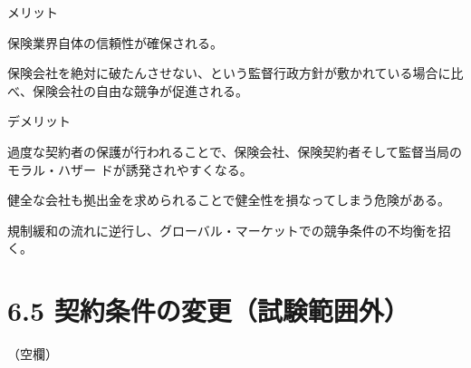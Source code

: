 \documentclass[report,gutter=10mm,fore-edge=10mm,uplatex,dvipdfmx]{jlreq}
\begin{document}
メリット

保険業界自体の信頼性が確保される。

保険会社を絶対に破たんさせない、という監督行政方針が敷かれている場合に比べ、保険会社の自由な競争が促進される。

デメリット

過度な契約者の保護が行われることで、保険会社、保険契約者そして監督当局のモラル・ハザー
ドが誘発されやすくなる。

健全な会社も拠出金を求められることで健全性を損なってしまう危険がある。

規制緩和の流れに逆行し、グローバル・マーケットでの競争条件の不均衡を招く。


\section{6.5 契約条件の変更（試験範囲外）}
（空欄）
\end{document}

